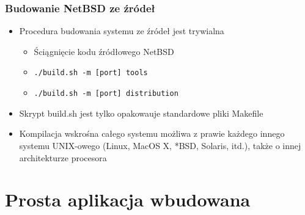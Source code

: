 \documentclass[dvipsnames,table]{beamer}
\begin{document}
\begin{frame}
\frametitle{Budowanie NetBSD ze źródeł}
\begin{itemize}
	\item Procedura budowania systemu ze źródeł jest trywialna
	\begin{itemize}
		\item Ściągnięcie kodu źródłowego NetBSD
		\item \tt{./build.sh -m [port] tools}
		\item \tt{./build.sh -m [port] distribution}
	\end{itemize}
	\item Skrypt build.sh jest tylko opakowauje standardowe pliki Makefile
	\item Kompilacja wskrośna całego systemu możliwa z prawie każdego innego systemu UNIX-owego (Linux, MacOS X, *BSD, Solaris, itd.), także o innej architekturze procesora
\end{itemize}
\end{frame}



\section{Prosta aplikacja wbudowana}
\end{document}
